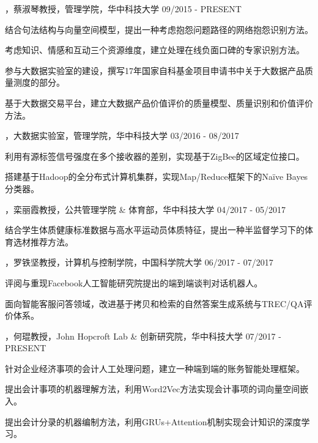 
\begin{cventries}

\cvexperience
{，蔡淑琴教授，管理学院，华中科技大学}
{09/2015 - PRESENT}
{
    \begin{cvitems}
    \item {结合句法结构与向量空间模型，提出一种考虑抱怨问题路径的网络抱怨识别方法。}
    \item {考虑知识、情感和互动三个资源维度，建立处理在线负面口碑的专家识别方法。}
    \item {参与大数据实验室的建设，撰写17年国家自科基金项目申请书中关于大数据产品质量测度的部分。}
    \item {基于大数据交易平台，建立大数据产品价值评价的质量模型、质量识别和价值评价方法。}
    \end{cvitems}
}

\cvexperience
{，大数据实验室，管理学院，华中科技大学}
{03/2016 - 08/2017}
{
    \begin{cvitems}
    \item {利用有源标签信号强度在多个接收器的差别，实现基于ZigBee的区域定位接口。}
    \item {搭建基于Hadoop的全分布式计算机集群，实现Map/Reduce框架下的Naïve Bayes分类器。}
    \end{cvitems}
}

\cvexperience
{，栾丽霞教授，公共管理学院 \& 体育部，华中科技大学}
{04/2017 - 05/2017}
{
    \begin{cvitems}
    \item {结合学生体质健康标准数据与高水平运动员体质特征，提出一种半监督学习下的体育选材推荐方法。}
    \end{cvitems}
}

\cvexperience
{，罗铁坚教授，计算机与控制学院，中国科学院大学}
{06/2017 - 07/2017}
{
    \begin{cvitems}
    \item {评阅与重现Facebook人工智能研究院提出的端到端谈判对话机器人。}
    \item {面向智能客服问答领域，改进基于拷贝和检索的自然答案生成系统与TREC/QA评价体系。}
    \end{cvitems}
}

\cvexperience
{，何琨教授，John Hopcroft Lab \& 创新研究院，华中科技大学}
{07/2017 - PRESENT}
{
    \begin{cvitems}
    \item {针对企业经济事项的会计人工处理问题，建立一种端到端的账务智能处理框架。}
    \item {提出会计事项的机器理解方法，利用Word2Vec方法实现会计事项的词向量空间嵌入。}
    \item {提出会计分录的机器编制方法，利用GRUs+Attention机制实现会计知识的深度学习。}
    \end{cvitems}
}

\end{cventries}